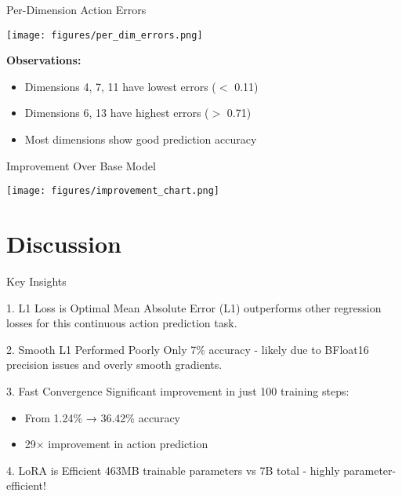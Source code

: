 \documentclass[aspectratio=169]{beamer}
\begin{document}
\begin{frame}{Per-Dimension Action Errors}
\begin{center}
\texttt{[image: figures/per\_dim\_errors.png]}
\end{center}

\textbf{Observations:}
\begin{itemize}
    \item Dimensions 4, 7, 11 have lowest errors ($<$ 0.11)
    \item Dimensions 6, 13 have highest errors ($>$ 0.71)
    \item Most dimensions show good prediction accuracy
\end{itemize}
\end{frame}

\begin{frame}{Improvement Over Base Model}
\begin{center}
\texttt{[image: figures/improvement\_chart.png]}
\end{center}
\end{frame}

\section{Discussion}

\begin{frame}{Key Insights}
\begin{block}{1. L1 Loss is Optimal}
Mean Absolute Error (L1) outperforms other regression losses for this continuous action prediction task.
\end{block}

\begin{block}{2. Smooth L1 Performed Poorly}
Only 7\% accuracy - likely due to BFloat16 precision issues and overly smooth gradients.
\end{block}

\begin{block}{3. Fast Convergence}
Significant improvement in just 100 training steps:
\begin{itemize}
    \item From 1.24\% → 36.42\% accuracy
    \item 29× improvement in action prediction
\end{itemize}
\end{block}

\begin{block}{4. LoRA is Efficient}
463MB trainable parameters vs 7B total - highly parameter-efficient!
\end{block}
\end{frame}
\end{document}
